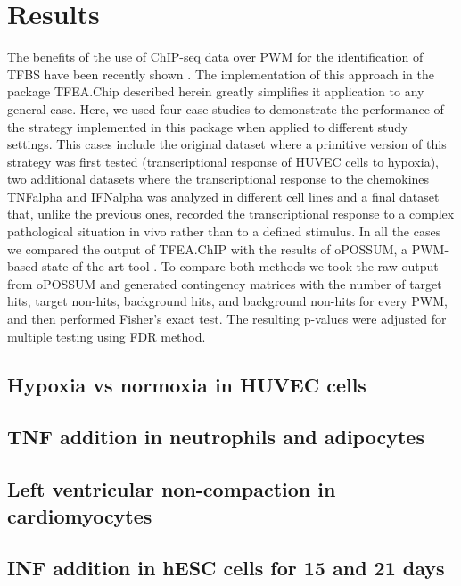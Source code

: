 \documentclass[10pt,letterpaper]{article}
\begin{document}
	\section*{Results}
	The benefits of the use of ChIP-seq data over PWM for the identification of TFBS have been recently shown \cite{Tiana2018a}. The implementation of this approach in the package TFEA.Chip described herein greatly simplifies it application to any general case. Here, we used four case studies to demonstrate the performance of the strategy implemented in this package when applied to different study settings. This cases include the original dataset where a primitive version of this strategy was first tested (transcriptional response of HUVEC cells to hypoxia), two additional datasets where the transcriptional response to the chemokines TNFalpha and IFNalpha was analyzed in different cell lines and a final dataset that, unlike the previous ones, recorded the transcriptional response to a complex pathological situation in vivo rather than to a defined stimulus. In all the cases we compared the output of TFEA.ChIP with the results of oPOSSUM, a PWM-based state-of-the-art tool \cite{Kwon2012}. To compare both methods we took the raw output from oPOSSUM and generated contingency matrices with the number of target hits, target non-hits, background hits, and background non-hits for every PWM, and then performed Fisher’s exact test. The resulting p-values were adjusted for multiple testing using FDR method.
	
	\subsection{Hypoxia vs normoxia in HUVEC cells}
	
	\subsection{TNF addition in neutrophils and adipocytes}
	
	\subsection{Left ventricular non-compaction in cardiomyocytes}
	
	\subsection{INF addition in hESC cells for 15 and 21 days}
	
\end{document}
